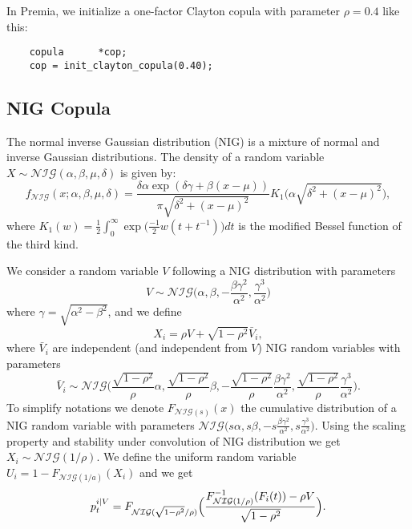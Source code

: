 \documentclass[10pt, a4paper]{article}
\newcommand{\NIG}{\mathcal{NIG}}
\begin{document}
In Premia, we initialize a one-factor Clayton copula with parameter $\rho = 0.4$ like this: 
\begin{lstlisting}
    copula      *cop;
    cop = init_clayton_copula(0.40);
\end{lstlisting}

\subsection{NIG Copula}
The normal inverse Gaussian distribution (NIG) is a mixture of normal and inverse Gaussian distributions. 
The density of a random variable $X \sim \NIG(\alpha, \beta, \mu, \delta)$ is given by:
\begin{equation*}
    f_{\NIG}(x; \alpha, \beta, \mu, \delta) = \frac{\delta \alpha \exp(\delta \gamma + \beta(x-\mu))}{\pi \sqrt{\delta^2+(x-\mu)^2}} K_1\bigl(\alpha \sqrt{\delta^2+(x-\mu)^2}\bigr),
\end{equation*}
where $K_1(w) = \frac{1}{2} \int_0^{\infty} \exp\bigl( \frac{-1}{2} w(t+t^{-1}) \bigr) d t$ is the modified Bessel function of the third kind.

We consider a random variable $V$ following a NIG distribution with parameters 
\begin{equation*}
    V \sim \NIG \bigl(\alpha, \beta, -\frac{\beta \gamma^2}{\alpha^2}, \frac{\gamma^3}{\alpha^2} \bigr)
\end{equation*}
where $\gamma = \sqrt{\alpha^2 - \beta^2}$, and we define 
\begin{equation*}
    X_i = \rho V + \sqrt{1-\rho^2} \bar{V}_i,
\end{equation*}
where $\bar{V}_i$ are independent (and independent from $V$) NIG random variables with parameters 
\begin{equation*}
    \bar{V}_i \sim \NIG \bigl(\frac{\sqrt{1-\rho^2}}{\rho} \alpha, \frac{\sqrt{1-\rho^2}}{\rho} \beta, -\frac{\sqrt{1-\rho^2}}{\rho} \frac{\beta \gamma^2}{\alpha^2}, \frac{\sqrt{1-\rho^2}}{\rho} \frac{\gamma^3}{\alpha^2} \bigr).
\end{equation*}
To simplify notations we denote $F_{\NIG(s)}(x)$ the cumulative distribution of a NIG random variable with parameters $\NIG\bigl(s \alpha, s \beta, - s \frac{\beta \gamma^2}{\alpha^2}, s \frac{\gamma^3}{\alpha^2} \bigr)$. Using the scaling property and stability under convolution of NIG distribution we get $X_i \sim \NIG(1/\rho)$. We define the uniform random variable $U_i = 1 - F_{\NIG(1/a)}(X_i)$ and we get 
\begin{equation*}
    p_t^{i|V} = F_{\NIG(\sqrt{1-\rho^2}/\rho)} \Bigl( \frac{F_{\NIG(1/\rho)}^{-1}(F_i(t)) - \rho V}{\sqrt{1-\rho^2}} \Bigr).
\end{equation*}
\end{document}
